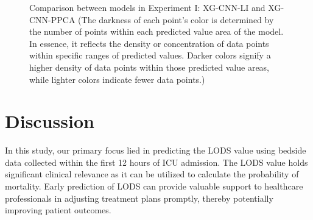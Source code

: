 \documentclass[12pt,a4paper,english
]{tunithesis}
\begin{document}
\begin{figure}
\begin{center}
    \qquad                        
      
    \caption[Results comparison in Experiment I]{Comparison between models in Experiment I: XG-CNN-LI and XG-CNN-PPCA (The darkness of each point's color is determined by the number of points within each predicted value area of the model. In essence, it reflects the density or concentration of data points within specific ranges of predicted values. Darker colors signify a higher density of data points within those predicted value areas, while lighter colors indicate fewer data points.)}
    \label{fig:experiment_2_result}
  \end{center}
\end{figure}

\chapter{Discussion}
\label{ch:discussion}

In this study, our primary focus lied in predicting the LODS value using bedside data collected within the first 12 hours of ICU admission. The LODS value holds significant clinical relevance as it can be utilized to calculate the probability of mortality. Early prediction of LODS can provide valuable support to healthcare professionals in adjusting treatment plans promptly, thereby potentially improving patient outcomes.
\end{document}
